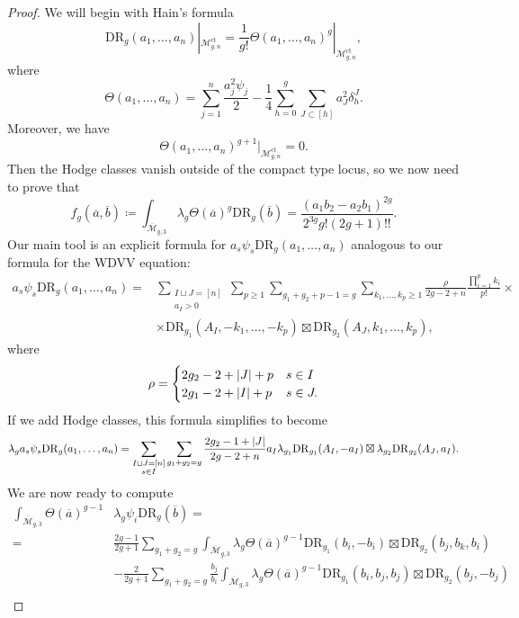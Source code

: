 \documentclass[leqno, openany]{memoir}
\theoremstyle{definition}
\theoremstyle{remark}
\theoremstyle{plain}
\theoremstyle{definition}
\theoremstyle{remark}
\newcommand{\mc}[1]{\mathcal{#1}}
\newcommand{\mr}[1]{\mathrm{#1}}
\newcommand{\ol}[1]{\overline{#1}}
\begin{document}
\begin{proof}
    We will begin with Hain's formula
    \[ \mr{DR}_g(a_1, \ldots, a_n) |_{\mc{M}_{g, n}^{\mr{ct}}} = \frac{1}{g!} \Theta(a_1, \ldots, a_n)^g|_{\mc{M}_{g, n}^{\mr{ct}}}, \]
    where
    \[ \Theta(a_1, \ldots, a_n) = \sum_{j=1}^n \frac{a_j^2 \psi_j}{2} - \frac{1}{4} \sum_{h=0}^g \sum_{J \subset [h]} a_J^2 \delta_h^J. \]
    Moreover, we have
    \[ \Theta(a_1, \ldots, a_n)^{g+1} |_{\mc{M}_{g, n}^{\mr{ct}}} = 0. \]
    Then the Hodge classes vanish outside of the compact type locus, so we now need to prove that
    \[ f_{g}(\ol{a}, \ol{b}) \coloneqq \int_{\ol{\mc{M}}_{g,3}} \lambda_g \Theta(\ol{a})^g \mr{DR}_g(\ol{b}) =\frac{(a_1b_2 - a_2 b_1)^{2g}}{2^{3g}g!(2g+1)!!}. \]
    Our main tool is an explicit formula for $a_s \psi_s \mr{DR}_g(a_1, \ldots, a_n)$ analogous to our formula for the WDVV equation:
    \begin{align*} 
        a_s \psi_s \mr{DR}_g(a_1, \ldots, a_n) ={} & \sum_{\substack{I \sqcup J = [n] \\ a_I > 0}} \sum_{p \geq 1} \sum_{g_1+g_2+p-1 = g} \sum_{k_1,\ldots,k_p \geq 1} \frac{\rho}{2g-2+n} \frac{\prod_{i=1}^p k_i}{p!} \times \\
        & \times \mr{DR}_{g_1}(A_I, -k_1, \ldots, -k_p) \boxtimes \mr{DR}_{g_2}(A_J, k_1, \ldots, k_p),
    \end{align*}
    where
    \[ \rho = \begin{cases}
        2g_2-2+\abs{J}+p & s \in I \\
        2g_1 - 2 + \abs{I} + p & s \in J.
    \end{cases}
    \]
    If we add Hodge classes, this formula simplifies to become
    \[ \lambda_g a_s \psi_s \mr{DR}_g(a_1, \ldots, a_n) = \sum_{\substack{I \sqcup J = [n] \\ s \in I}} \sum_{g_1+g_2 = g} \frac{2g_2-1+\abs{J}}{2g-2+n} a_I \lambda_{g_1} \mr{DR}_{g_1}(A_I, -a_I) \boxtimes \lambda_{g_2}\mr{DR}_{g_2}(A_J, a_I). \]
    We are now ready to compute
    \begin{align*} 
        \int_{\ol{\mc{M}}_{g,3}} \Theta(\ol{a})^{g-1} &\lambda_g \psi_i \mr{DR}_g(\ol{b}) =  \\
        ={}& \frac{2g-1}{2g+1} \sum_{g_1+g_2=g} \int_{\ol{\mc{M}}_{g,3}} \lambda_g \Theta(\ol{a})^{g-1} \mr{DR}_{g_1}(b_i,-b_i) \boxtimes \mr{DR}_{g_2}(b_j,b_k, b_i) \\
        & -\frac{2}{2g+1} \sum_{g_1+g_2 = g} \frac{b_j}{b_i} \int_{\ol{\mc{M}}_{g,3}} \lambda_g \Theta(\ol{a})^{g-1} \mr{DR}_{g_1}(b_i,b_j,b_j) \boxtimes \mr{DR}_{g_2}(b_j,-b_j) \\

\end{align*}
\end{proof}
\end{document}
